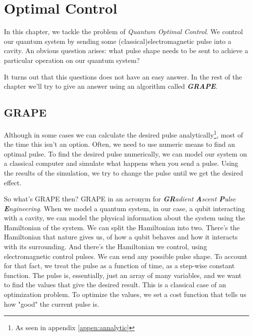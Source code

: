 \section{Optimal Control}\label{chap:optimal}
In this chapter, we tackle the problem of \textit{Quantum Optimal Control}. We control our quantum system by sending some (classical)electromagnetic pulse into a cavity. An obvious question arises: what pulse shape needs to be sent to achieve a particular operation on our quantum system? 

It turns out that this questions does not have an easy answer. In the rest of the chapter we'll try to give an answer using an algorithm called \textbf{\textit{GRAPE}}.

\subsection{GRAPE}
Although in some cases we can calculate the desired pulse analytically\footnote{As seen in appendix \ref{appen:annalytic}}, most of the time this isn't an option. Often, we need to use numeric means to find an optimal pulse. To find the desired pulse numerically, we can model our system on a classical computer and simulate what happens when you send a pulse. Using the results of the simulation, we try to change the pulse until we get the desired effect.

So what's GRAPE then? GRAPE in an acronym for \textit{\textbf{GR}adient \textbf{A}scent \textbf{P}ulse \textbf{E}ngineering}. When we model a quantum system, in our case, a qubit interacting with a cavity, we can model the physical information about the system using the Hamiltonian of the system. We can split the Hamiltonian into two. There's the Hamiltonian that nature gives us, of how a qubit behaves and how it interacts with its surrounding. And there's the Hamiltonian we control, using electromagnetic control pulses. We can send any possible pulse shape. To account for that fact, we treat the pulse as a function of time, as a step-wise constant function. The pulse is, essentially, just an array of many variables, and we want to find the values that give the desired result. This is a classical case of an optimization problem. To optimize the values, we set a cost function that tells us how "good" the current pulse is.

